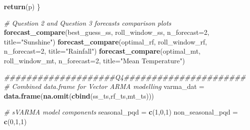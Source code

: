 \documentclass[
  11pt,
]{article}
\newenvironment{Shaded}{\begin{snugshade}}{\end{snugshade}}
\newcommand{\CommentTok}[1]{\textcolor[rgb]{0.56,0.35,0.01}{\textit{#1}}}
\newcommand{\DataTypeTok}[1]{\textcolor[rgb]{0.13,0.29,0.53}{#1}}
\newcommand{\DecValTok}[1]{\textcolor[rgb]{0.00,0.00,0.81}{#1}}
\newcommand{\KeywordTok}[1]{\textcolor[rgb]{0.13,0.29,0.53}{\textbf{#1}}}
\newcommand{\NormalTok}[1]{#1}
\newcommand{\StringTok}[1]{\textcolor[rgb]{0.31,0.60,0.02}{#1}}
\begin{document}
\begin{Shaded}
\begin{Highlighting}[]
{{{{{{{{  \KeywordTok{return}\NormalTok{(p)}
\NormalTok{\}}

\CommentTok{# Question 2 and Question 3 forecasts comparison plots}
\KeywordTok{forecast_compare}\NormalTok{(best_guess_ss, }
\NormalTok{                 roll_window_ss, }
                 \DataTypeTok{n_forecast=}\DecValTok{2}\NormalTok{, }
                 \DataTypeTok{title=}\StringTok{"Sunshine"}\NormalTok{)}
\KeywordTok{forecast_compare}\NormalTok{(optimal_rf, }
\NormalTok{                 roll_window_rf, }
                 \DataTypeTok{n_forecast=}\DecValTok{2}\NormalTok{, }
                 \DataTypeTok{title=}\StringTok{"Rainfall"}\NormalTok{)}
\KeywordTok{forecast_compare}\NormalTok{(optimal_mt, }
\NormalTok{                 roll_window_mt, }
                 \DataTypeTok{n_forecast=}\DecValTok{2}\NormalTok{, }
                 \DataTypeTok{title=}\StringTok{"Mean Temperature"}\NormalTok{)}

\CommentTok{####################Q4######################}
\CommentTok{# Combined data.frame for Vector ARMA modelling}
\NormalTok{varma_dat =}\StringTok{ }\KeywordTok{data.frame}\NormalTok{(}\KeywordTok{na.omit}\NormalTok{(}\KeywordTok{cbind}\NormalTok{(ss_ts,rf_ts,mt_ts)))}

\CommentTok{# sVARMA model components}
\NormalTok{seasonal_pqd =}\StringTok{ }\KeywordTok{c}\NormalTok{(}\DecValTok{1}\NormalTok{,}\DecValTok{0}\NormalTok{,}\DecValTok{1}\NormalTok{)}
\NormalTok{non_seasonal_pqd =}\StringTok{ }\KeywordTok{c}\NormalTok{(}\DecValTok{0}\NormalTok{,}\DecValTok{1}\NormalTok{,}\DecValTok{1}\NormalTok{)}

}}}}}}}}
\end{Highlighting}
\end{Shaded}
\end{document}
